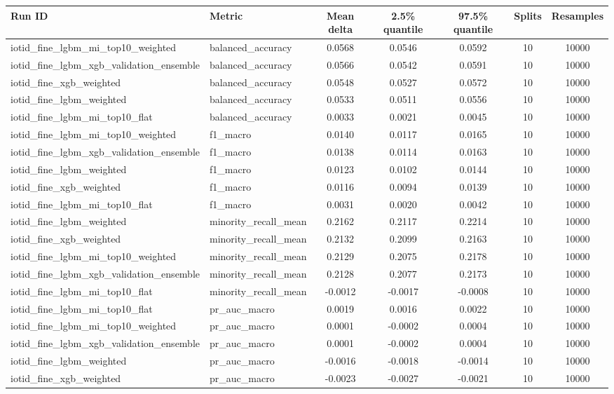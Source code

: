 \documentclass[10pt]{article}
\begin{document}
\begin{center}
\tiny
\begin{longtable}{llccccc}
\toprule
Run ID & Metric & Mean delta & 2.5\% quantile & 97.5\% quantile & Splits & Resamples \\
\midrule
\endhead
iotid\_fine\_lgbm\_mi\_top10\_weighted & balanced\_accuracy & 0.0568 & 0.0546 & 0.0592 & 10 & 10000 \\
iotid\_fine\_lgbm\_xgb\_validation\_ensemble & balanced\_accuracy & 0.0566 & 0.0542 & 0.0591 & 10 & 10000 \\
iotid\_fine\_xgb\_weighted & balanced\_accuracy & 0.0548 & 0.0527 & 0.0572 & 10 & 10000 \\
iotid\_fine\_lgbm\_weighted & balanced\_accuracy & 0.0533 & 0.0511 & 0.0556 & 10 & 10000 \\
iotid\_fine\_lgbm\_mi\_top10\_flat & balanced\_accuracy & 0.0033 & 0.0021 & 0.0045 & 10 & 10000 \\
iotid\_fine\_lgbm\_mi\_top10\_weighted & f1\_macro & 0.0140 & 0.0117 & 0.0165 & 10 & 10000 \\
iotid\_fine\_lgbm\_xgb\_validation\_ensemble & f1\_macro & 0.0138 & 0.0114 & 0.0163 & 10 & 10000 \\
iotid\_fine\_lgbm\_weighted & f1\_macro & 0.0123 & 0.0102 & 0.0144 & 10 & 10000 \\
iotid\_fine\_xgb\_weighted & f1\_macro & 0.0116 & 0.0094 & 0.0139 & 10 & 10000 \\
iotid\_fine\_lgbm\_mi\_top10\_flat & f1\_macro & 0.0031 & 0.0020 & 0.0042 & 10 & 10000 \\
iotid\_fine\_lgbm\_weighted & minority\_recall\_mean & 0.2162 & 0.2117 & 0.2214 & 10 & 10000 \\
iotid\_fine\_xgb\_weighted & minority\_recall\_mean & 0.2132 & 0.2099 & 0.2163 & 10 & 10000 \\
iotid\_fine\_lgbm\_mi\_top10\_weighted & minority\_recall\_mean & 0.2129 & 0.2075 & 0.2178 & 10 & 10000 \\
iotid\_fine\_lgbm\_xgb\_validation\_ensemble & minority\_recall\_mean & 0.2128 & 0.2077 & 0.2173 & 10 & 10000 \\
iotid\_fine\_lgbm\_mi\_top10\_flat & minority\_recall\_mean & -0.0012 & -0.0017 & -0.0008 & 10 & 10000 \\
iotid\_fine\_lgbm\_mi\_top10\_flat & pr\_auc\_macro & 0.0019 & 0.0016 & 0.0022 & 10 & 10000 \\
iotid\_fine\_lgbm\_mi\_top10\_weighted & pr\_auc\_macro & 0.0001 & -0.0002 & 0.0004 & 10 & 10000 \\
iotid\_fine\_lgbm\_xgb\_validation\_ensemble & pr\_auc\_macro & 0.0001 & -0.0002 & 0.0004 & 10 & 10000 \\
iotid\_fine\_lgbm\_weighted & pr\_auc\_macro & -0.0016 & -0.0018 & -0.0014 & 10 & 10000 \\
iotid\_fine\_xgb\_weighted & pr\_auc\_macro & -0.0023 & -0.0027 & -0.0021 & 10 & 10000 \\
\bottomrule
\end{longtable}
\end{center}
\end{document}

